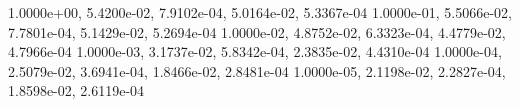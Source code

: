 1.0000e+00, 5.4200e-02, 7.9102e-04, 5.0164e-02, 5.3367e-04 
1.0000e-01, 5.5066e-02, 7.7801e-04, 5.1429e-02, 5.2694e-04 
1.0000e-02, 4.8752e-02, 6.3323e-04, 4.4779e-02, 4.7966e-04 
1.0000e-03, 3.1737e-02, 5.8342e-04, 2.3835e-02, 4.4310e-04 
1.0000e-04, 2.5079e-02, 3.6941e-04, 1.8466e-02, 2.8481e-04 
1.0000e-05, 2.1198e-02, 2.2827e-04, 1.8598e-02, 2.6119e-04 
